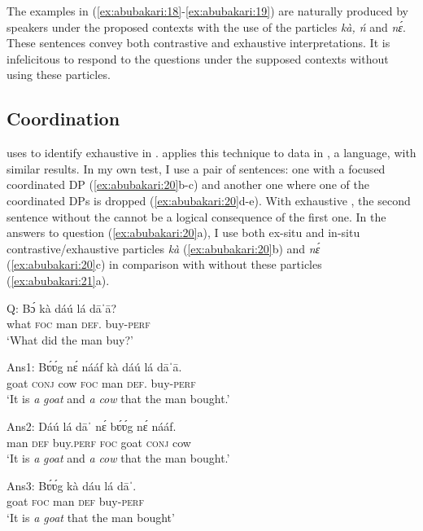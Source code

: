 \documentclass[output=paper
,newtxmath
,modfonts
,nonflat]{langsci/langscibook}
\begin{document}
The examples in (\ref{ex:abubakari:18}-\ref{ex:abubakari:19}) are naturally produced by speakers under the proposed contexts with the use of the particles \textit{kà, ń} and \textit{nɛ́}. These sentences convey both contrastive and exhaustive  interpretations. It is infelicitous to respond to the questions under the supposed contexts without using these particles.
 

\subsection{Coordination}

\citet{szabolcsi1981} uses  to identify exhaustive  in . \citet{duah2015} applies this technique to data in , a  language, with similar results. In my own test, I use a pair of sentences: one with a focused coordinated DP (\ref{ex:abubakari:20}b-c) and another one where one of the coordinated DPs is dropped (\ref{ex:abubakari:20}d-e). With exhaustive , the second sentence without the  cannot be a logical consequence of the first one. In the answers to question (\ref{ex:abubakari:20}a), I use both ex-situ and in-situ contrastive/exhaustive particles \textit{kà} (\ref{ex:abubakari:20}b) and \textit{nɛ́} (\ref{ex:abubakari:20}c) in comparison with  without these particles (\ref{ex:abubakari:21}a).

 
\ea\label{ex:abubakari:20}
\ea\label{ex:abubakari:20a}
\gll Q: Bɔ́  kà  dáú  lá  dāˈā?\\                      what  \textsc{foc}  man  \textsc{def}.  buy-\textsc{perf}   \\
\glt ‘What did the man buy?’

\ex\label{ex:abubakari:20b}
Ans1: \gll Bʋ́ʋ́g  nɛ́  nááf  kà  dáú  lá  dāˈā.\\
goat    \textsc{conj}  cow  \textsc{foc}  man  \textsc{def}.  buy-\textsc{perf}\\
\glt ‘It is \textit{a} \textit{goat} and \textit{a} \textit{cow} that the man bought.’

\ex\label{ex:abubakari:20c}
Ans2: \gll Dáú  lá  dāˈ    nɛ́  bʋ́ʋ́g  nɛ́  nááf.\\
man  \textsc{def}  buy.\textsc{perf}  \textsc{foc}  goat  \textsc{conj}  cow \\
\glt ‘It is \textit{a} \textit{goat} and \textit{a} \textit{cow} that the man bought.’

\ex\label{ex:abubakari:20d}
Ans3: \gll {\#}Bʋ́ʋ́g  kà  dáu  lá  dāˈ.\\ 
goat    \textsc{foc}  man  \textsc{def}  buy-\textsc{perf}\\                           
\glt ‘It is \textit{a goat} that the man bought’          
\end{document}
